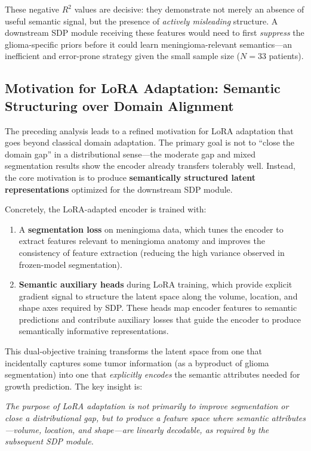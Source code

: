 \documentclass[11pt,a4paper]{article}
\theoremstyle{definition}
\begin{document}
These negative $R^2$ values are decisive: they demonstrate not merely an absence of useful semantic signal, but the presence of \emph{actively misleading} structure. A downstream SDP module receiving these features would need to first \emph{suppress} the glioma-specific priors before it could learn meningioma-relevant semantics---an inefficient and error-prone strategy given the small sample size ($N = 33$ patients).

\subsection{Motivation for LoRA Adaptation: Semantic Structuring over Domain Alignment}\label{sec:lora-motivation}

The preceding analysis leads to a refined motivation for LoRA adaptation that goes beyond classical domain adaptation. The primary goal is not to ``close the domain gap'' in a distributional sense---the moderate gap and mixed segmentation results show the encoder already transfers tolerably well. Instead, the core motivation is to produce \textbf{semantically structured latent representations} optimized for the downstream SDP module.

Concretely, the LoRA-adapted encoder is trained with:
\begin{enumerate}[nosep]
  \item A \textbf{segmentation loss} on meningioma data, which tunes the encoder to extract features relevant to meningioma anatomy and improves the consistency of feature extraction (reducing the high variance observed in frozen-model segmentation).
  \item \textbf{Semantic auxiliary heads} during LoRA training, which provide explicit gradient signal to structure the latent space along the volume, location, and shape axes required by SDP. These heads map encoder features to semantic predictions and contribute auxiliary losses that guide the encoder to produce semantically informative representations.
\end{enumerate}

This dual-objective training transforms the latent space from one that incidentally captures some tumor information (as a byproduct of glioma segmentation) into one that \emph{explicitly encodes} the semantic attributes needed for growth prediction. The key insight is:

\begin{tcolorbox}[colback=gray!5!white,colframe=gray!50!black]
\emph{The purpose of LoRA adaptation is not primarily to improve segmentation or close a distributional gap, but to produce a feature space where semantic attributes---volume, location, and shape---are linearly decodable, as required by the subsequent SDP module.}
\end{tcolorbox}
\end{document}
